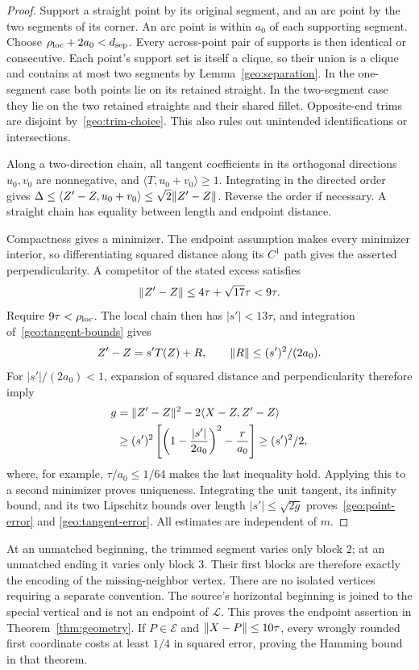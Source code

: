 \begin{proof}
Support a straight point by its original segment, and an arc point by
the two segments of its corner. An arc point is within $a_0$ of each
supporting segment. Choose $\rho_{\rm loc}+2a_0<d_{\rm sep}$.
Every across-point pair of supports is then identical or consecutive.
Each point's support set is itself a clique, so their union is a clique
and contains at most two segments by Lemma~\ref{geo:separation}. In the
one-segment case both points lie on its retained straight. In the
two-segment case they lie on the two retained straights and their
shared fillet. Opposite-end trims are disjoint by~\eqref{geo:trim-choice}.
This also rules out unintended identifications or intersections.

Along a two-direction chain, all tangent coefficients in its orthogonal
directions $u_0,v_0$ are nonnegative, and
$\langle T,u_0+v_0\rangle\ge1$. Integrating in the directed order gives
$\Delta\le\langle Z'-Z,u_0+v_0\rangle\le\sqrt2\lVert Z'-Z\rVert$.
Reverse the order if necessary. A straight chain has equality between
length and endpoint distance.

Compactness gives a minimizer. The endpoint assumption makes every
minimizer interior, so differentiating squared distance along its
$C^1$ path gives the asserted perpendicularity. A competitor of the
stated excess satisfies
\[
 \lVert Z'-Z\rVert\le4\tau+\sqrt{17}\tau<9\tau.
\]
Require $9\tau<\rho_{\rm loc}$. The local chain then has
$|s'|<13\tau$, and integration of~\eqref{geo:tangent-bounds} gives
\[
 Z'-Z=s'T(Z)+R,\qquad \lVert R\rVert\le(s')^2/(2a_0).
\]
For $|s'|/(2a_0)<1$, expansion of squared distance and perpendicularity
therefore imply
\begin{align*}
 g&=\lVert Z'-Z\rVert^2-2\langle X-Z,Z'-Z\rangle\\
  &\ge(s')^2\left[
      \left(1-\frac{|s'|}{2a_0}\right)^2-\frac r{a_0}\right]
   \ge(s')^2/2,
\end{align*}
where, for example, $\tau/a_0\le1/64$ makes the last inequality hold.
Applying this to a second minimizer proves uniqueness. Integrating the
unit tangent, its infinity bound, and its two Lipschitz bounds over
length $|s'|\le\sqrt{2g}$ proves~\eqref{geo:point-error} and
\eqref{geo:tangent-error}. All estimates are independent of $m$.
\end{proof}

At an unmatched beginning, the trimmed segment varies only block $2$;
at an unmatched ending it varies only block $3$. Their first blocks
are therefore exactly the encoding of the missing-neighbor vertex.
There are no isolated vertices requiring a separate convention. The
source's horizontal beginning is joined to the special vertical and
is not an endpoint of $\mathcal L$. This proves the endpoint assertion
in Theorem~\ref{thm:geometry}. If $P\in\mathcal E$ and $\lVert X-P\rVert\le10\tau$, every wrongly
rounded first coordinate costs at least $1/4$ in squared error, proving
the Hamming bound in that theorem.

